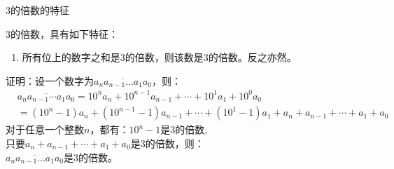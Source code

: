 \documentclass[aspectratio=169]{ctexbeamer} %
\date{\today}
\begin{document}
\begin{frame}[t]{3的倍数的特征}
\begin{spacing}{1.2}
\normalsize
3的倍数，具有如下特征：
\begin{enumerate}[label={\arabic*.}]
\item \alert{所有位上的数字之和是3的倍数，则该数是3的倍数。反之亦然。}
\end{enumerate}
证明：设一个数字为$\overline{a_{n}a_{n-1} \dots a_{1}a_{0}}$，则：
\begin{align*}
&\overline{a_{n}a_{n-1} \cdots a_{1}a_{0}} = 10^{n}a_{n} + 10^{n-1}a_{n-1} +\cdots + 10^{1}a_{1} + 10^0a_{0} \\
&=(10^{n}-1)a_{n} + (10^{n-1}-1)a_{n-1}+ \cdots + (10^{1}-1)a_{1} + a_{n} +  a_{n-1} +\cdots + a_{1} + a_{0} 
\end{align*}
对于任意一个整数$n$，都有：$10^{n}-1$是3的倍数, \\
只要$a_{n} +  a_{n-1} +\cdots + a_{1} + a_{0}$是3的倍数，则：\\
$\overline{a_{n}a_{n-1} \dots a_{1}a_{0}}$是3的倍数。
\end{spacing}
\end{frame}
\end{document}
